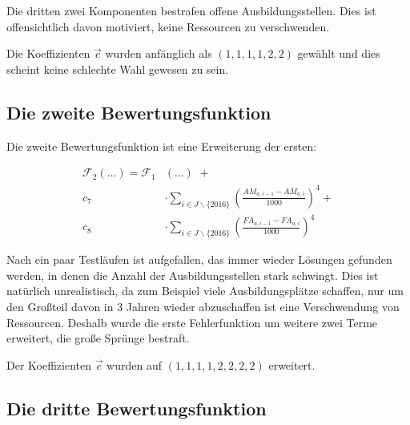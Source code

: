 \documentclass[a4paper,12pt]{article}
\begin{document}
Die dritten zwei Komponenten bestrafen offene Ausbildungsstellen. Dies ist offensichtlich davon motiviert, keine Ressourcen zu verschwenden.

Die Koeffizienten $\vec c$ wurden anfänglich als $(1,1,1,1,2,2)$ gewählt und dies scheint keine schlechte Wahl gewesen zu sein.

%
%
%

\subsection{Die zweite Bewertungsfunktion}

Die zweite Bewertungsfunktion ist eine Erweiterung der ersten:

\begin{align*}
\mathcal F_2(\hdots) =	\mathcal F_1&(\hdots) \hspace{4pt} + \\
			c_7 &\cdot \sum\limits_{i\in J\backslash\{2016\}} \left( \frac{AM_{a,i-1} - AM_{a,i} }{1000} \right) ^ 4 + \\
			c_8 &\cdot \sum\limits_{i\in J\backslash\{2016\}} \left( \frac{FA_{a,i-1} - FA_{a,i} }{1000} \right) ^ 4
\end{align*}

Nach ein paar Testläufen ist aufgefallen, das immer wieder Lösungen gefunden werden, in denen die Anzahl der Ausbildungsstellen stark schwingt. Dies ist natürlich unrealistisch, da zum Beispiel viele Ausbildungsplätze schaffen, nur um den Großteil davon in 3 Jahren wieder abzuschaffen ist eine Verschwendung von Ressourcen. Deshalb wurde die erste Fehlerfunktion um weitere zwei Terme erweitert, die große Sprünge bestraft. 

Der Koeffizienten $\vec c$ wurden auf $(1,1,1,1,2,2,2,2)$ erweitert. 

\subsection{Die dritte Bewertungsfunktion}
\end{document}
